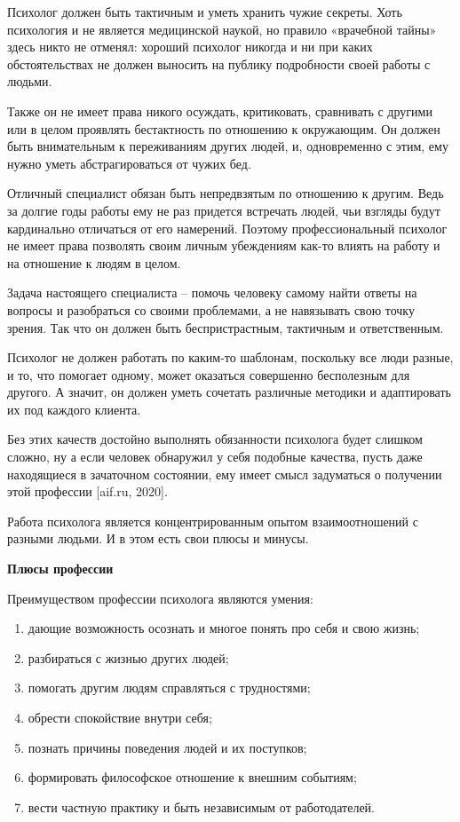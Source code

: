 Психолог должен быть тактичным и уметь хранить чужие секреты. Хоть психология и не является медицинской наукой, но правило «врачебной тайны» здесь никто не отменял: хороший психолог никогда и ни при каких обстоятельствах не должен выносить на публику подробности своей работы с людьми.

Также он не имеет права никого осуждать, критиковать, сравнивать с другими или в целом проявлять бестактность по отношению к окружающим. Он должен быть внимательным к переживаниям других людей, и, одновременно с этим, ему нужно уметь абстрагироваться от чужих бед.

Отличный специалист обязан быть непредвзятым по отношению к другим. Ведь за долгие годы работы ему не раз придется встречать людей, чьи взгляды будут кардинально отличаться от его намерений. Поэтому профессиональный психолог не имеет права позволять своим личным убеждениям как-то влиять на работу и на отношение к людям в целом.

Задача настоящего специалиста – помочь человеку самому найти ответы на вопросы и разобраться со своими проблемами, а не навязывать свою точку зрения. Так что он должен быть беспристрастным, тактичным и ответственным.

Психолог не должен работать по каким-то шаблонам, поскольку все люди разные, и то, что помогает одному, может оказаться совершенно бесполезным для другого. А значит, он должен уметь сочетать различные методики и адаптировать их под каждого клиента.

Без этих качеств достойно выполнять обязанности психолога будет слишком сложно, ну а если человек обнаружил у себя подобные качества, пусть даже находящиеся в зачаточном состоянии, ему имеет смысл задуматься о получении этой профессии [aif.ru, 2020].

Работа психолога является концентрированным опытом взаимоотношений с разными людьми. И в этом есть свои плюсы и минусы.

\textbf{Плюсы профессии}

Преимуществом профессии психолога являются умения:
\begin{enumerate}
    \item дающие возможность осознать и многое понять про себя и свою жизнь;
    \item разбираться с жизнью других людей;
    \item помогать другим людям справляться с трудностями;
    \item обрести спокойствие внутри себя;
    \item познать причины поведения людей и их поступков;
    \item формировать философское отношение к внешним событиям;
    \item вести частную практику и быть независимым от работодателей.
\end{enumerate}


